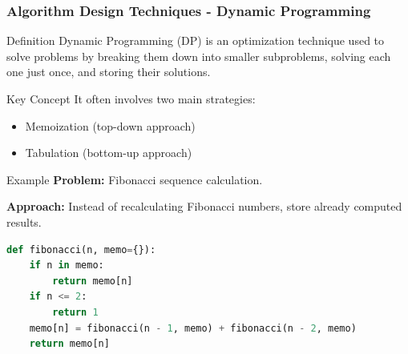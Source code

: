 \documentclass{beamer}
\begin{document}
\begin{frame}[fragile]
    \frametitle{Algorithm Design Techniques - Dynamic Programming}
    \begin{block}{Definition}
        Dynamic Programming (DP) is an optimization technique used to solve problems by breaking them down into smaller subproblems, 
        solving each one just once, and storing their solutions.
    \end{block}

    \begin{block}{Key Concept}
        It often involves two main strategies:
        \begin{itemize}
            \item Memoization (top-down approach)
            \item Tabulation (bottom-up approach)
        \end{itemize}
    \end{block}

    \begin{block}{Example}
        \textbf{Problem:} Fibonacci sequence calculation.
        
        \textbf{Approach:} Instead of recalculating Fibonacci numbers, store already computed results.
    \end{block}
    
    \begin{lstlisting}[language=Python]
def fibonacci(n, memo={}):
    if n in memo:
        return memo[n]
    if n <= 2:
        return 1
    memo[n] = fibonacci(n - 1, memo) + fibonacci(n - 2, memo)
    return memo[n]
    \end{lstlisting}
\end{frame}
\end{document}
